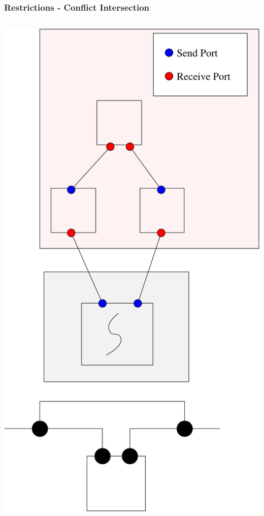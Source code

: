 \documentclass[compress,xcolor=dvipsnames,10pt]{beamer}
\begin{document}
\begin{frame}
\frametitle{Restrictions - Conflict Intersection}
\begin{columns}
\begin{column}{0.4\textwidth}
\begin{center}
\includegraphics[scale=0.35]{restrictionIntersection.pdf}
\end{center}

\end{column}
\end{columns}
\end{frame}
\end{document}
